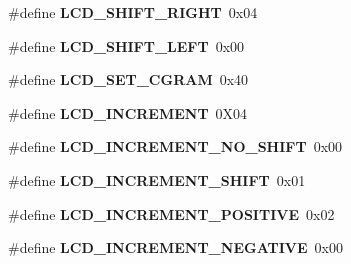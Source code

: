\begin{DoxyCompactItemize}
\item 
\hypertarget{group__lcd__h_ga8ab3108396a0d33dbf7f3ab6477ba01d}{\#define {\bfseries L\-C\-D\-\_\-\-S\-H\-I\-F\-T\-\_\-\-R\-I\-G\-H\-T}~0x04}\label{group__lcd__h_ga8ab3108396a0d33dbf7f3ab6477ba01d}

\item 
\hypertarget{group__lcd__h_ga941377571f34b9d898b61ce89f10226d}{\#define {\bfseries L\-C\-D\-\_\-\-S\-H\-I\-F\-T\-\_\-\-L\-E\-F\-T}~0x00}\label{group__lcd__h_ga941377571f34b9d898b61ce89f10226d}

\item 
\hypertarget{group__lcd__h_gaeb37f5be802499adedd4f9366797bf0a}{\#define {\bfseries L\-C\-D\-\_\-\-S\-E\-T\-\_\-\-C\-G\-R\-A\-M}~0x40}\label{group__lcd__h_gaeb37f5be802499adedd4f9366797bf0a}

\item 
\hypertarget{group__lcd__h_gab1fb2568cd5b8fb0f9103652a3deb895}{\#define {\bfseries L\-C\-D\-\_\-\-I\-N\-C\-R\-E\-M\-E\-N\-T}~0\-X04}\label{group__lcd__h_gab1fb2568cd5b8fb0f9103652a3deb895}

\item 
\hypertarget{group__lcd__h_ga06315bb86679bb3ef1aff07e62aab6de}{\#define {\bfseries L\-C\-D\-\_\-\-I\-N\-C\-R\-E\-M\-E\-N\-T\-\_\-\-N\-O\-\_\-\-S\-H\-I\-F\-T}~0x00}\label{group__lcd__h_ga06315bb86679bb3ef1aff07e62aab6de}

\item 
\hypertarget{group__lcd__h_gaa861073d2f5122bb8092023f9970d3a0}{\#define {\bfseries L\-C\-D\-\_\-\-I\-N\-C\-R\-E\-M\-E\-N\-T\-\_\-\-S\-H\-I\-F\-T}~0x01}\label{group__lcd__h_gaa861073d2f5122bb8092023f9970d3a0}

\item 
\hypertarget{group__lcd__h_ga0a7949ac27e6fece73d67a48eca643e9}{\#define {\bfseries L\-C\-D\-\_\-\-I\-N\-C\-R\-E\-M\-E\-N\-T\-\_\-\-P\-O\-S\-I\-T\-I\-V\-E}~0x02}\label{group__lcd__h_ga0a7949ac27e6fece73d67a48eca643e9}

\item 
\hypertarget{group__lcd__h_gaecbb4fa221268f1c6ea267379a97055f}{\#define {\bfseries L\-C\-D\-\_\-\-I\-N\-C\-R\-E\-M\-E\-N\-T\-\_\-\-N\-E\-G\-A\-T\-I\-V\-E}~0x00}\label{group__lcd__h_gaecbb4fa221268f1c6ea267379a97055f}

\end{DoxyCompactItemize}
